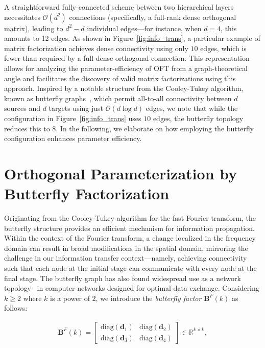 A straightforward fully-connected scheme between two hierarchical layers necessitates $\mathcal{O}(d^2)$ connections (specifically, a full-rank dense orthogonal matrix), leading to $d^2-d$ individual edges—for instance, when $d=4$, this amounts to 12 edges. As shown in Figure~\ref{fig:info_trans}, a particular example of matrix factorization achieves dense connectivity using only $10$ edges, which is fewer than required by a full dense orthogonal connection. This representation allows for analyzing the parameter-efficiency of OFT from a graph-theoretical angle and facilitates the discovery of valid matrix factorizations using this approach. Inspired by a notable structure from the Cooley-Tukey algorithm, known as butterfly graphs~\cite{cooley1965algorithm}, which permit all-to-all connectivity between $d$ sources and $d$ targets using just $\mathcal{O}(d\log d)$ edges, we note that while the configuration in Figure~\ref{fig:info_trans} uses $10$ edges, the butterfly topology reduces this to $8$. In the following, we elaborate on how employing the butterfly configuration enhances parameter efficiency.

\section{Orthogonal Parameterization by Butterfly Factorization}

Originating from the Cooley-Tukey algorithm for the fast Fourier transform, the butterfly structure provides an efficient mechanism for information propagation. Within the context of the Fourier transform, a change localized in the frequency domain can result in broad modifications in the spatial domain, mirroring the challenge in our information transfer context—namely, achieving connectivity such that each node at the initial stage can communicate with every node at the final stage. The butterfly graph has also found widespread use as a network topology~\cite{solihin2015fundamentals,li2011linear} in computer networks designed for optimal data exchange. Considering $k\geq 2$ where $k$ is a power of $2$, we introduce the \emph{butterfly factor} $\bm{B}^F(k)$ as follows:

\begin{equation}\label{eq:but_factor}
\begin{aligned}
    \bm{B}^F(k)=\begin{bmatrix}
    \text{diag}(\bm{d}_1) & \text{diag}(\bm{d}_2) \\
    \text{diag}(\bm{d}_3) & \text{diag}(\bm{d}_4)
    \end{bmatrix}\in\mathbb{R}^{k\times k},
\end{aligned}
\end{equation}

